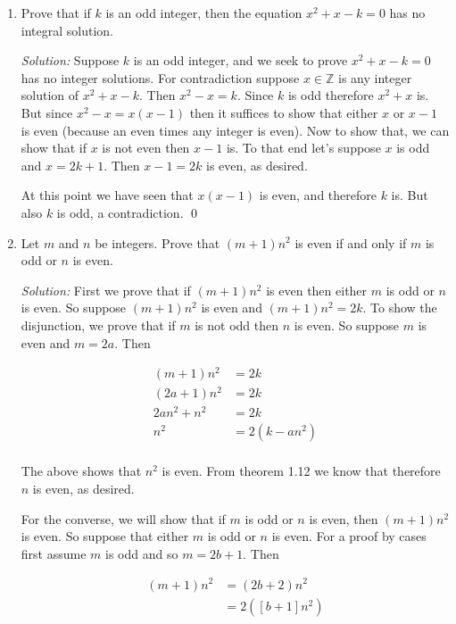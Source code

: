 \documentclass[12pt]{article}
\begin{document}
{\begin{enumerate}
\begin{align*}
    5x-7 &= 5(2n)-7 \\
    &= 2(5n-4)+1
\end{align*}

and since $5n-4$ is an integer then $5x-7$ is odd. \qed

\item Prove that if $k$ is an odd integer, then the equation $x^2 + x - k = 0$ has no integral solution.

{\it Solution:} Suppose $k$ is an odd integer, and we seek to prove $x^2+x-k=0$ has no integer solutions.  For contradiction suppose $x\in \mathbb Z$ is any integer solution of $x^2+x-k$.  Then $x^2 - x = k$. Since $k$ is odd therefore $x^2+x$ is.  But since $x^2-x=x(x-1)$ then it suffices to show that either $x$ or $x-1$ is even (because an even times any integer is even).  Now to show that, we can show that if $x$ is not even then $x-1$ is.  To that end let's suppose $x$ is odd and $x=2k+1$.  Then $x-1=2k$ is even, as desired.

At this point we have seen that $x(x-1)$ is even, and therefore $k$ is.  But also $k$ is odd, a contradiction.  \Lightning \qed
	
\item Let $m$ and $n$ be integers. Prove that $(m+1)n^2$ is even if and only if $m$ is odd or $n$ is even.

{\it Solution:} First we prove that if $(m+1)n^2$ is even then either $m$ is odd or $n$ is even.  So suppose $(m+1)n^2$ is even and $(m+1)n^2 = 2k$.  To show the disjunction, we prove that if $m$ is not odd then $n$ is even. So suppose $m$ is even and $m=2a$.  Then 

\begin{align*}
    (m+1)n^2 &= 2k \\
    (2a+1)n^2 &= 2k \\
    2an^2 + n^2 &= 2k \\
    n^2 &= 2(k-an^2)\\
\end{align*}

The above shows that $n^2$ is even.  From theorem 1.12 we know that therefore $n$ is even, as desired.  

For the converse, we will show that if $m$ is odd or $n$ is even, then $(m+1)n^2$ is even.  So suppose that either $m$ is odd or $n$ is even.  For a proof by cases first assume $m$ is odd and so $m = 2b+1$.  Then 

\begin{align*}
    (m+1)n^2 & = (2b+2)n^2 \\
    &= 2( [b+1]n^2)\\
\end{align*}


\end{enumerate}}
\end{document}

